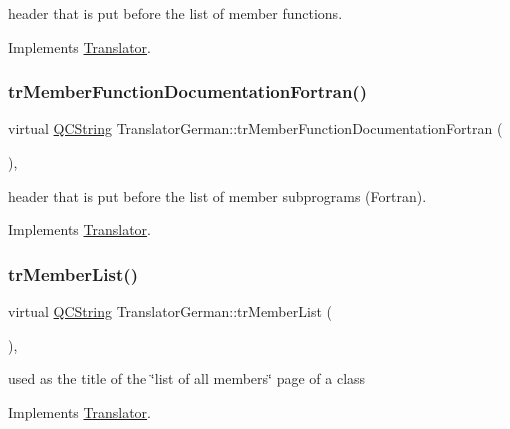 header that is put before the list of member functions. 

Implements \mbox{\hyperlink{class_translator}{Translator}}.

\mbox{\label{class_translator_german_a5aba68025b2a7fb7eda6667c5b4d6064}} 
\subsubsection{\texorpdfstring{trMemberFunctionDocumentationFortran()}{trMemberFunctionDocumentationFortran()}}
{\footnotesize\ttfamily virtual \mbox{\hyperlink{class_q_c_string}{Q\+C\+String}} Translator\+German\+::tr\+Member\+Function\+Documentation\+Fortran (\begin{DoxyParamCaption}{ }\end{DoxyParamCaption})\hspace{0.3cm}{\ttfamily [inline]}, {\ttfamily [virtual]}}

header that is put before the list of member subprograms (Fortran). 

Implements \mbox{\hyperlink{class_translator}{Translator}}.

\mbox{\label{class_translator_german_a50a36cd9db7770c3308bbd9130f04923}} 
\subsubsection{\texorpdfstring{trMemberList()}{trMemberList()}}
{\footnotesize\ttfamily virtual \mbox{\hyperlink{class_q_c_string}{Q\+C\+String}} Translator\+German\+::tr\+Member\+List (\begin{DoxyParamCaption}{ }\end{DoxyParamCaption})\hspace{0.3cm}{\ttfamily [inline]}, {\ttfamily [virtual]}}

used as the title of the \char`\"{}list of all members\char`\"{} page of a class 

Implements \mbox{\hyperlink{class_translator}{Translator}}.

